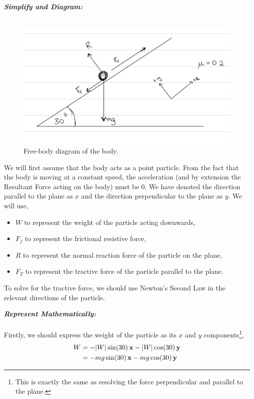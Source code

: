 \begin{subquestions}
\begin{subsubquestions}
	
	
	
\textbf{\textit{Simplify and Diagram:}} \\ \\
\begin{figure} [H]
	\begin{center}
		\includegraphics[scale=0.25]{../2016/figures/2016q6-1}
		\caption{\label{2016:q6:Diagram1} Free-body diagram of the body.}
	\end{center}
\end{figure}
We will first assume that the body acts as a point particle. From the fact that the body is moving at a constant speed, the acceleration (and by extension the Resultant Force acting on the body) must be 0. We have denoted the direction parallel to the plane as $x$ and the direction perpendicular to the plane as $y$. 
We will use,
\begin{itemize}
	\item $W$ to represent the weight of the particle acting downwards,
	\item $F_f$ to represent the frictional resistive force,
	\item $R$ to represent the normal reaction force of the particle on the plane,
	\item $F_T$ to represent the tractive force of the particle parallel to the plane.
\end{itemize}
To solve for the tractive force, we should use Newton's Second Law in the relevant directions of the particle.




\textbf{\textit{Represent Mathematically:}} \\ \\
Firstly, we should express the weight of the particle as its $x$ and $y$ components\footnote{This is exactly the same as resolving the force perpendicular and parallel to the plane.},
\begin{align}
	W & = -|W|\sin(30)\,\mathbf{x} - |W|\cos(30)\,\mathbf{y} \nonumber \\
	  & = -mg\sin(30)\,\mathbf{x} - mg\cos(30)\,\mathbf{y} \nonumber \\
\end{align}
	

\end{subsubquestions}
\end{subquestions}
